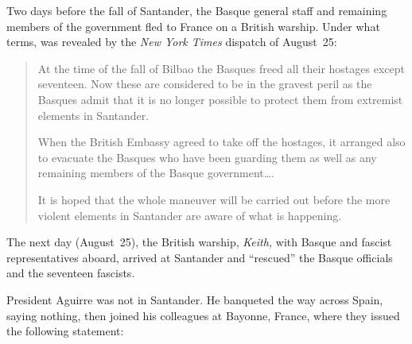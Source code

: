 Two days before the fall of Santander, the Basque general staff and remaining members of the government fled to France on a British warship. Under what terms, was revealed by the \emph{New York Times} dispatch of August~25:

\begin{quotation}
  At the time of the fall of Bilbao the Basques freed all their hostages except seventeen. Now these are considered to be in the gravest peril as the Basques admit that it is no longer possible to protect them from extremist elements in Santander.
  
  When the British Embassy agreed to take off the hostages, it arranged also to evacuate the Basques who have been guarding them as well as any remaining members of the Basque government\dots.
  
  It is hoped that the whole maneuver will be carried out before the more violent elements in Santander are aware of what is happening.
\end{quotation}

The next day (August~25), the British warship, \emph{Keith,} with Basque and fascist representatives aboard, arrived at Santander and ``res\-cued'' the Basque officials and the seventeen fascists.

President Aguirre was not in Santander. He banqueted the way across Spain, saying nothing, then joined his colleagues at Bayonne, France, where they issued the following statement:


